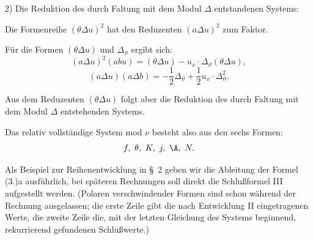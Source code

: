 2) Die Reduktion des durch Faltung mit dem Modul $\Delta$ entstandenen Systems:

Die Formenreihe $(\theta\Delta u)^2$ hat den Reduzenten $(a\Delta u)^2$ zum Faktor.

Für die Formen $(\theta\Delta u)$ und $\Delta_\vartheta$ ergibt sich:
\[
(a\Delta u)^2(abu)=(\theta\Delta u)-u_x\cdot\Delta_\vartheta(\theta\Delta u),
\]
\[
(a\Delta u)(a\Delta b)=-\frac12\Delta_\vartheta+\frac12u_x\cdot\Delta_\vartheta^2.
\]

Aus dem Reduzenten $(\theta\Delta u)$ folgt aber die Reduktion des durch Faltung mit dem Modul $\Delta$ entstehenden Systems.

\bigskip

Das relativ vollständige System mod $\nu$ besteht also aus den sechs Formen:
\[
f,\ \theta,\ K,\ j,\ \A,\ N.
\]

Als Beispiel zur Reihenentwicklung in \S\ 2 geben wir die Ableitung der Formel (3.)a ausführlich, bei späteren Rechnungen soll direkt die Schlußformel III aufgestellt werden. (Polaren verschwindender Formen sind schon während der Rechnung ausgelassen; die erste Zeile gibt die nach Entwicklung II eingetragenen Werte, die zweite Zeile die, mit der letzten Gleichung des Systems beginnend, rekurrierend gefundenen Schlußwerte.)

